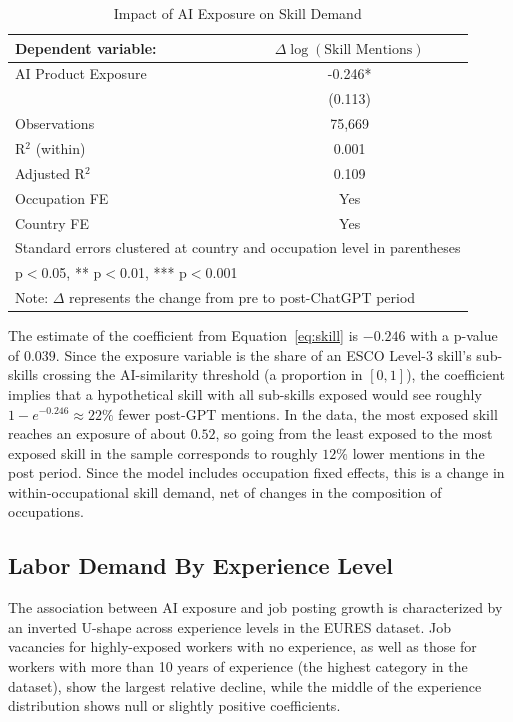 \documentclass[11pt]{article}
\begin{document}
\begin{table}[htbp]
\centering
\caption{Impact of AI Exposure on Skill Demand}
\begin{tabular}{lc}
\hline\hline
Dependent variable: & $\Delta \log(\text{Skill Mentions})$ \\
\midrule
AI Product Exposure & -0.246* \\
 & (0.113) \\
\midrule
Observations & 75,669 \\
R$^2$ (within) & 0.001 \\
Adjusted R$^2$ & 0.109 \\
Occupation FE & Yes \\
Country FE & Yes \\
\hline\hline
\multicolumn{2}{l}{\footnotesize Standard errors clustered at country and occupation level in parentheses} \\
\multicolumn{2}{l}{\footnotesize * p$<$0.05, ** p$<$0.01, *** p$<$0.001} \\
\multicolumn{2}{l}{\footnotesize Note: $\Delta$ represents the change from pre to post-ChatGPT period} \\
\end{tabular}
\label{table:skill_model}
\end{table}

The estimate of the coefficient from Equation~\ref{eq:skill} is $-0.246$ with a p-value of $0.039$. Since the exposure variable is the share of an ESCO Level-3 skill's sub-skills crossing the AI-similarity threshold (a proportion in $[0,1]$), the coefficient implies that a hypothetical skill with all sub-skills exposed would see roughly $1-e^{-0.246} \approx 22\%$ fewer post-GPT mentions. In the data, the most exposed skill reaches an exposure of about $0.52$, so going from the least exposed to the most exposed skill in the sample corresponds to roughly $12\%$ lower mentions in the post period. Since the model includes occupation fixed effects, this is a change in within-occupational skill demand, net of changes in the composition of occupations.

\subsection{Labor Demand By Experience Level}

The association between AI exposure and job posting growth is characterized by an inverted U-shape across experience levels in the EURES dataset. Job vacancies for highly-exposed workers with no experience, as well as those for workers with more than 10 years of experience (the highest category in the dataset), show the largest relative decline, while the middle of the experience distribution shows null or slightly positive coefficients.
\end{document}
